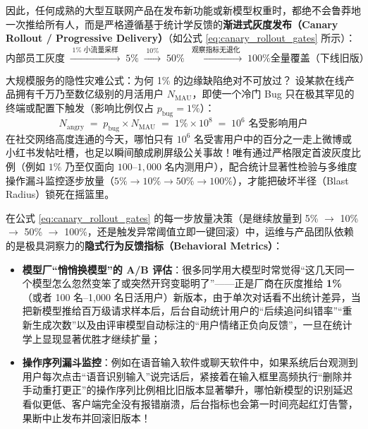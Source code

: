 \documentclass[a4paper]{article}
\begin{document}
因此，任何成熟的大型互联网产品在发布新功能或新模型权重时，都绝不会鲁莽地一次推给所有人，而是严格遵循基于统计学反馈的\textbf{渐进式灰度发布（Canary Rollout / Progressive Delivery）}（如公式 \eqref{eq:canary_rollout_gates} 所示）：
\begin{equation}
\text{内部员工灰度}
\;\xrightarrow{\;1\% \text{ 小流量采样}\;}\;
\text{5\%}
\;\xrightarrow{\;10\%\;}\;
\text{50\%}
\;\xrightarrow{\;\text{观察指标无退化}\;}\;
\text{100\% 全量覆盖（下线旧版）}
\label{eq:canary_rollout_gates}
\end{equation}

\begin{importantbox}{大规模服务的隐性灾难公式：为何 1\% 的边缘缺陷绝对不可放过？}
设某款在线产品拥有千万乃至数亿级别的月活用户 $N_{\text{MAU}}$，即使一个冷门 Bug 只在极其罕见的终端或配置下触发（影响比例仅占 $p_{\text{bug}} = 1\%$）：
\begin{equation}
N_{\text{angry}} \;=\; p_{\text{bug}} \times N_{\text{MAU}} \;=\; 1\% \times 10^8 \;=\; 10^6\text{ 名受影响用户}
\label{eq:one_percent_blast_radius}
\end{equation}
在社交网络高度连通的今天，哪怕只有 $10^6$ 名受害用户中的百分之一走上微博或小红书发帖吐槽，也足以瞬间酿成刷屏级公关事故！唯有通过严格限定首波灰度比例（例如 $1\%$ 乃至仅面向 $100$--$1,000$ 名内测用户），配合统计显著性检验与多维度操作漏斗监控逐步放量（$5\% \to 10\% \to 50\% \to 100\%$），才能把破坏半径（Blast Radius）锁死在摇篮里。
\end{importantbox}

在公式 \eqref{eq:canary_rollout_gates} 的每一步放量决策（是继续放量到 5\% $\to$ 10\% $\to$ 50\% $\to$ 100\%，还是触发异常阈值立即一键回滚）中，运维与产品团队依赖的是极具洞察力的\textbf{隐式行为反馈指标（Behavioral Metrics）}：
\begin{itemize}
    \item \textbf{模型厂“悄悄换模型”的 A/B 评估}：很多同学用大模型时常觉得“这几天同一个模型怎么忽然变笨了或突然开窍变聪明了”——正是厂商在灰度推给 \textbf{1\%}（或者 100 名--1,000 名日活用户）新版本，由于单次对话看不出统计差异，当把新模型推给百万级请求样本后，后台自动统计用户的“后续追问纠错率”“重新生成次数”以及由评审模型自动标注的“用户情绪正负向反馈”，一旦在统计学上显现显著优胜才继续扩量；
    \item \textbf{操作序列漏斗监控}：例如在语音输入软件或聊天软件中，如果系统后台观测到用户每次点击“语音识别输入”说完话后，紧接着在输入框里高频执行“删除并手动重打更正”的操作序列比例相比旧版本显著攀升，哪怕新模型的识别延迟看似更低、客户端完全没有报错崩溃，后台指标也会第一时间亮起红灯告警，果断中止发布并回滚旧版本！
\end{itemize}
\end{document}
